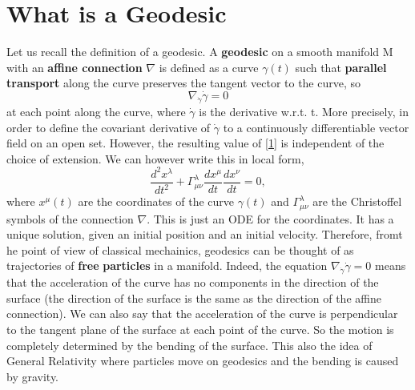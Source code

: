 \documentclass[a4paper,10pt]{article}
\begin{document}
  \section{What is a Geodesic}
 Let us recall the definition of a geodesic. 
 A \textbf{geodesic} on a smooth manifold M with an \textbf{affine connection} $\nabla$ is defined as a curve 
 $\gamma(t)$ such that \textbf{parallel transport} along the curve preserves the tangent vector to the curve, so 
 \begin{equation}\label{1}
  \nabla_{\dot{\gamma}} \dot{\gamma} = 0
 \end{equation}
at each point along the curve, where $\dot{\gamma}$ is the derivative w.r.t. t. More precisely, in order to define the 
covariant derivative of $\dot{\gamma}$ to a continuously differentiable vector field on an open set. 
However, the resulting value of \ref{1} is independent of the choice of extension.
    We can however write this in local form, 
    \begin{equation*}
     \dfrac{d^{2} x^{\lambda}}{dt^2} + \Gamma_{\mu \nu}^{\lambda} \dfrac{dx^{\mu}}{dt} \dfrac{dx^{\nu}}{dt} = 0,
    \end{equation*}
where $x^{\mu}(t)$ are the coordinates of the curve $\gamma(t)$ and $\Gamma_{\mu \nu}^{\lambda}$ are the Christoffel
symbols of the connection $\nabla$. This is just an ODE for the coordinates. It has a unique solution, given an
initial position and an initial velocity. Therefore, fromt he point of view of classical mechainics, geodesics can 
be thought of as trajectories of \textbf{free} \textbf{particles} in a manifold. Indeed, the equation 
$\nabla_{\dot{\gamma}}\dot{\gamma} = 0$ means that the acceleration of the curve has no components in the direction 
of the surface (the direction of the surface is the same as the direction of the affine connection). We can also 
say that the acceleration of the curve is perpendicular to the tangent plane of the surface at each point of the
curve. So the motion is completely determined by the bending of the surface. This also the idea of General Relativity where
particles move on geodesics and the bending is caused by gravity. 
\end{document}
